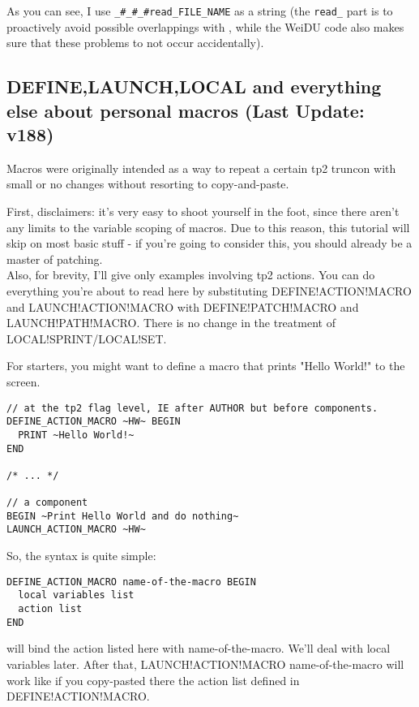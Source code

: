 \documentclass{article}
\def\ttref#1{\ahrefloc{#1}{\tt #1}}
\begin{document}
As you can see, I use \verb+_#_#_#read_FILE_NAME+ as a string (the \verb+read_+
part is to proactively avoid possible overlappings with
\ttref{SET!2DA!ENTRY!LATER}, while the WeiDU code also makes sure that these
problems to not occur accidentally).

\subsection{DEFINE,LAUNCH,LOCAL and everything else about personal macros (Last Update: v188)}

Macros were originally intended as a way to repeat a certain tp2 truncon
with small or no changes without resorting to copy-and-paste.

First, disclaimers: it's very easy to shoot yourself in the foot, since
there aren't any limits to the variable scoping of macros. Due to this reason, this tutorial
will skip on most basic stuff - if you're going to consider this, you should
already be a master of patching. \\
Also, for brevity, I'll give only examples involving tp2 actions. You can
do everything you're about to read here by substituting DEFINE!ACTION!MACRO
and LAUNCH!ACTION!MACRO with DEFINE!PATCH!MACRO and LAUNCH!PATH!MACRO. There
is no change in the treatment of LOCAL!SPRINT/LOCAL!SET.

For starters, you might want to define a macro that prints "Hello World!" to
the screen.

\begin{verbatim}
// at the tp2 flag level, IE after AUTHOR but before components.
DEFINE_ACTION_MACRO ~HW~ BEGIN
  PRINT ~Hello World!~
END

/* ... */

// a component
BEGIN ~Print Hello World and do nothing~
LAUNCH_ACTION_MACRO ~HW~
\end{verbatim}

So, the syntax is quite simple:
\begin{verbatim}
DEFINE_ACTION_MACRO name-of-the-macro BEGIN
  local variables list
  action list
END
\end{verbatim}
will bind the action listed here with name-of-the-macro. We'll deal with
local variables later. After that, LAUNCH!ACTION!MACRO name-of-the-macro
will work like if you copy-pasted there the action list defined in
DEFINE!ACTION!MACRO.
\end{document}
